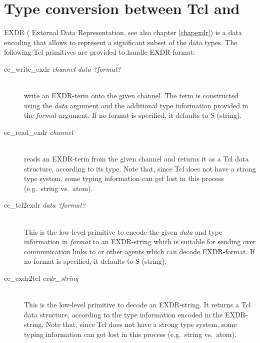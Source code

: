 \section{Type conversion between Tcl and {\eclipse}}
\label{secexdrtcl}

EXDR ({\eclipse} External Data Representation, see also chapter
\ref{chapexdr}) is a data encoding that allows to represent a
significant subset of the {\eclipse} data types.  The following Tcl
primitives are provided to handle EXDR-format:
\begin{description}
\item[\label{ecwriteexdr}ec_write_exdr {\it channel data ?format?}]\ \\
        write an EXDR-term onto the given channel.
        The term is constructed using the {\it data} argument and
        the additional type information provided in the {\it format}
        argument. If no format is specified, it defaults to S (string).

\item[\label{ecreadexdr}ec_read_exdr {\it channel}]\ \\
        reads an EXDR-term from the given channel and returns it
        as a Tcl data structure, according to its type. Note that,
        since Tcl does not have a strong type system, some typing
        information can get lost in this process (e.g.\ string vs.\ atom).

\item[ec_tcl2exdr {\it data ?format?}]\ \\
        This is the low-level primitive to encode the given {\it data} and
        type information in {\it format} to an EXDR-string which is
        suitable for sending over communication links to {\eclipse} or
        other agents which can decode EXDR-format.
        If no format is specified, it defaults to S (string).

\item[ec_exdr2tcl {\it exdr_string}]\ \\
        This is the low-level primitive to decode an EXDR-string.
        It returns a Tcl data structure, according to the type information
        encoded in the EXDR-string. Note that,
        since Tcl does not have a strong type system, some typing
        information can get lost in this process (e.g.\ string vs.\ atom).
\end{description}

